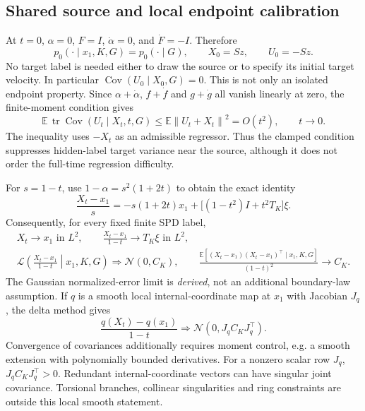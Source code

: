 \documentclass[11pt,letterpaper]{article}
\newcommand{\E}{\mathbb E}
\newcommand{\cN}{\mathcal N}
\newcommand{\Cov}{\operatorname{Cov}}
\newcommand{\tr}{\operatorname{tr}}
\newcommand{\norm}[1]{\left\lVert#1\right\rVert}
\begin{document}
\subsection{Shared source and local endpoint calibration}
At $t=0$, $\alpha=0$, $F=I$, $\dot\alpha=0$, and $\dot F=-I$. Therefore
\begin{equation}
p_0(\cdot\mid x_1,K,G)=p_0(\cdot\mid G),\qquad X_0=Sz,\qquad U_0=-Sz.
\label{eq:source-check}
\end{equation}
No target label is needed either to draw the source or to specify its initial target velocity. In particular $\Cov(U_0\mid X_0,G)=0$.
This is not only an isolated endpoint property. Since $\alpha+\dot\alpha$, $f+\dot f$ and $g+\dot g$ all vanish linearly at zero, the finite-moment condition gives
\begin{equation}
\E\,\tr\Cov(U_t\mid X_t,t,G)
\leq\E\norm{U_t+X_t}^2=O(t^2),\qquad t\to0.
\label{eq:early-regression}
\end{equation}
The inequality uses $-X_t$ as an admissible regressor. Thus the clamped condition suppresses hidden-label target variance near the source, although it does not order the full-time regression difficulty.


For $s=1-t$, use $1-\alpha=s^2(1+2t)$ to obtain the exact identity
\begin{equation}
\frac{X_t-x_1}{s}
=-s(1+2t)x_1+\bigl[(1-t^2)I+t^2T_K\bigr]\xi.
\label{eq:full-error}
\end{equation}
Consequently, for every fixed finite SPD label,
\begin{equation}
\boxed{\begin{gathered}
X_t\longrightarrow x_1\text{ in }L^2,\qquad
\frac{X_t-x_1}{1-t}\longrightarrow T_K\xi\text{ in }L^2,\\
\mathcal L\!\left(\frac{X_t-x_1}{1-t}\middle|x_1,K,G\right)
\Rightarrow\cN(0,C_K),\qquad
\frac{\E[(X_t-x_1)(X_t-x_1)^\top\mid x_1,K,G]}{(1-t)^2}\longrightarrow C_K.
\end{gathered}}
\label{eq:endpoint}
\end{equation}
The Gaussian normalized-error limit is \emph{derived}, not an additional boundary-law assumption. If $q$ is a smooth local internal-coordinate map at $x_1$ with Jacobian $J_q$, the delta method gives
\begin{equation}
\frac{q(X_t)-q(x_1)}{1-t}\Rightarrow\cN(0,J_qC_KJ_q^\top).
\label{eq:internal}
\end{equation}
Convergence of covariances additionally requires moment control, e.g. a smooth extension with polynomially bounded derivatives. For a nonzero scalar row $J_q$, $J_qC_KJ_q^\top>0$. Redundant internal-coordinate vectors can have singular joint covariance. Torsional branches, collinear singularities and ring constraints are outside this local smooth statement.
\end{document}
